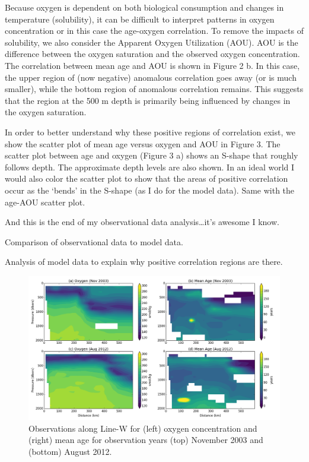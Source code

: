 \documentclass[11pt]{article} %
\begin{document}
Because oxygen is dependent on both biological consumption and changes in temperature
(solubility), it can be difficult to interpret patterns in oxygen concentration or
in this case the age-oxygen correlation. To remove the impacts of solubility, we
also consider the Apparent Oxygen Utilization (AOU). AOU is the difference between
the oxygen saturation and the observed oxygen concentration. The correlation
between mean age and AOU is shown in Figure 2 b. In this case, the upper region of
(now negative) anomalous correlation goes away (or is much smaller), while the bottom
region of anomalous correlation remains. This suggests that the region at the 500 m
depth is primarily being influenced by changes in the oxygen saturation.

In order to better understand why these positive regions of correlation exist, we
show the scatter plot of mean age versus oxygen and AOU in Figure 3. The scatter plot
between age and oxygen (Figure 3 a) shows an S-shape that roughly follows depth.
The approximate depth levels are also shown. In an ideal world I would also color
the scatter plot to show that the areas of positive correlation occur as the `bends'
in the S-shape (as I do for the model data). Same with the age-AOU scatter plot.

And this is the end of my observational data analysis\ldots it's awesome I know.

Comparison of observational data to model data.

Analysis of model data to explain why positive correlation regions are there.


{\footnotesize
   
}

\clearpage

\begin{figure}
\noindent
\centering
\includegraphics[width=43pc]{age_oxygen_figure1.png}
\caption{Observations along Line-W for (left) oxygen concentration and (right)
mean age for observation years (top) November 2003 and (bottom) August 2012.}
\label{fig:obs_age_o2_contour}
\end{figure}
\end{document}
